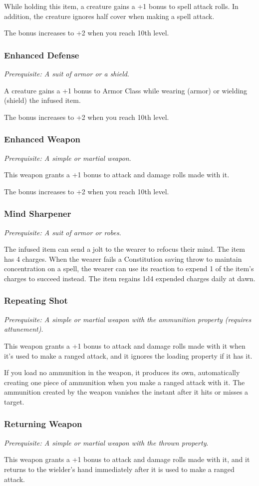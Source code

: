         While holding this item, a creature gains a +1 bonus to spell attack rolls. In addition, the creature ignores half cover when making a spell attack.

        The bonus increases to +2 when you reach 10th level.
    \subsubsection{Enhanced Defense}
        \textit{Prerequisite: A suit of armor or a shield}.

        A creature gains a +1 bonus to Armor Class while wearing (armor) or wielding (shield) the infused item.

        The bonus increases to +2 when you reach 10th level.
    \subsubsection{Enhanced Weapon}
        \textit{Prerequisite: A simple or martial weapon}.

        This weapon grants a +1 bonus to attack and damage rolls made with it.

        The bonus increases to +2 when you reach 10th level.
    \subsubsection{Mind Sharpener}
        \textit{Prerequisite: A suit of armor or robes}.

        The infused item can send a jolt to the wearer to refocus their mind.
        The item has 4 charges.
        When the wearer fails a Constitution saving throw to maintain concentration on a spell, the wearer can use its reaction to expend 1 of the item's charges to succeed instead.
        The item regains 1d4 expended charges daily at dawn.
    \subsubsection{Repeating Shot}
        \textit{Prerequisite: A simple or martial weapon with the ammunition property (requires attunement)}.

        This weapon grants a +1 bonus to attack and damage rolls made with it when it's used to make a ranged attack, and it ignores the loading property if it has it.

        If you load no ammunition in the weapon, it produces its own, automatically creating one piece of ammunition when you make a ranged attack with it.
        The ammunition created by the weapon vanishes the instant after it hits or misses a target.
    \subsubsection{Returning Weapon}
        \textit{Prerequisite: A simple or martial weapon with the thrown property}.

        This weapon grants a +1 bonus to attack and damage rolls made with it, and it returns to the wielder's hand immediately after it is used to make a ranged attack.
